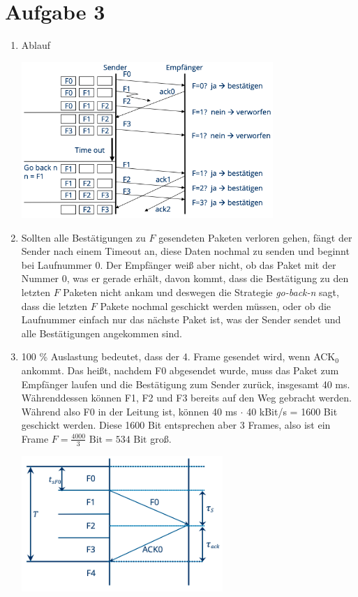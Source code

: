 \documentclass{article}
\begin{document}
	\section*{Aufgabe 3}
	\begin{enumerate}[label=(\alph*)]
		\item Ablauf
		\begin{center}
			\includegraphics[width=0.75\textwidth]{./pics/TCP-Schiebefenster}
		\end{center}
		\item Sollten alle Bestätigungen zu $F$ gesendeten Paketen verloren gehen, fängt der Sender nach einem Timeout an, diese Daten nochmal zu senden und beginnt bei Laufnummer 0. Der Empfänger weiß aber nicht, ob das Paket mit der Nummer 0, was er gerade erhält, davon kommt, dass die Bestätigung zu den letzten $F$ Paketen nicht ankam und deswegen die Strategie \textit{go-back-n} sagt, dass die letzten $F$ Pakete nochmal geschickt werden müssen, oder ob die Laufnummer einfach nur das nächste Paket ist, was der Sender sendet und alle Bestätigungen angekommen sind.
		\item 100 \% Auslastung bedeutet, dass der 4. Frame gesendet wird, wenn ACK$_0$ ankommt. Das heißt, nachdem F0 abgesendet wurde, muss das Paket zum Empfänger laufen und die Bestätigung zum Sender zurück, insgesamt 40 ms. Währenddessen können F1, F2 und F3 bereits auf den Weg gebracht werden. Während also F0 in der Leitung ist, können 40 ms $\cdot$ 40 kBit/s = 1600 Bit geschickt werden. Diese 1600 Bit entsprechen aber 3 Frames, also ist ein Frame $F=\frac{4000}{3}\text{ Bit} = 534 \text{ Bit}$ groß.
		\begin{center}
			\includegraphics[width=0.6\textwidth]{./pics/Schiebefenster}
		\end{center}
	\end{enumerate}
\end{document}
